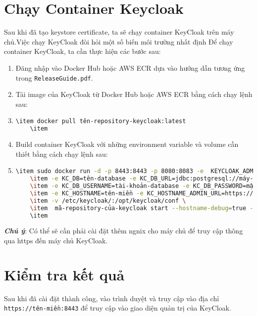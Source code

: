 \section{Chạy Container Keycloak}
Sau khi đã tạo keystore certificate, ta sẽ chạy container KeyCloak trên máy chủ.Việc chạy KeyCloak đòi hỏi một số biến môi trường nhất định  Để chạy container KeyCloak, ta cần thực hiện các bước sau:
\begin{enumerate}
    \item Đăng nhập vào Docker Hub hoặc AWS ECR dựa vào hướng dẫn tương ứng trong \texttt{ReleaseGuide.pdf}.
    \item Tải image của KeyCloak từ Docker Hub hoặc AWS ECR bằng cách chạy lệnh sau:
    \item \begin{lstlisting}[language=bash]
    \item docker pull tên-repository-keycloak:latest
    \item \end{lstlisting}
    \item Build container KeyCloak với những environment variable và volume cần thiết bằng cách chạy lệnh sau:
    \item \begin{lstlisting}[language=bash]
    \item sudo docker run -d -p 8443:8443 -p 8080:8083 -e  KEYCLOAK_ADMIN=tài-khoản-admin -e KEYCLOAK_ADMIN_PASSWORD=mật-khẩu-admin \
    \item -e KC_DB=tên-database -e KC_DB_URL=jdbc:postgresql://máy-chủ-database:port-máy-chủ/tên-database \
    \item -e KC_DB_USERNAME=tài-khoản-database -e KC_DB_PASSWORD=mật-khẩu-database \
    \item -e KC_HOSTNAME=tên-miền -e KC_HOSTNAME_ADMIN_URL=https://tên-miền \
    \item -v /etc/keycloak/:/opt/keycloak/conf \
    \item  mã-repository-của-keycloak start --hostname-debug=true --https-key-store-file=/conf/keycloak.p12 --https-key-store-password=mật-khẩu-cert
    \item \end{lstlisting}
\end{enumerate}
\textbf{\textit{Chú ý}}: Có thể sẽ cần phải cài đặt thêm ngnix cho máy chủ để truy cập thông qua https đến máy chủ KeyCloak.

\section{Kiểm tra kết quả}
Sau khi đã cài đặt thành công, vào trình duyệt và truy cập vào địa chỉ \texttt{https://tên-miền:8443} để truy cập vào giao diện quản trị của KeyCloak.




